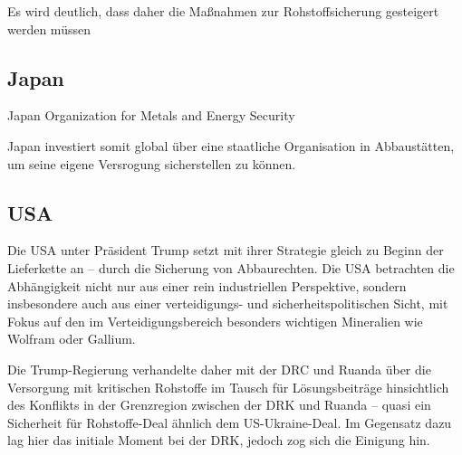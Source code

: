 \documentclass[12pt,a4paper,oneside]{book} %
\begin{document}
Es wird deutlich, dass daher die Maßnahmen zur Rohstoffsicherung gesteigert werden müssen


\subsection{Japan}

Japan Organization for Metals and Energy Security

Japan investiert somit global über eine staatliche Organisation in Abbaustätten, um seine eigene Versrogung sicherstellen zu können.


\subsection{USA}
Die USA unter Präsident Trump setzt mit ihrer Strategie gleich zu Beginn der Lieferkette an -- durch die Sicherung von Abbaurechten. Die USA betrachten die Abhängigkeit nicht nur aus einer rein industriellen Perspektive, sondern insbesondere auch aus einer verteidigungs- und sicherheitspolitischen Sicht, mit Fokus auf den im Verteidigungsbereich besonders wichtigen Mineralien wie Wolfram oder Gallium.

Die Trump-Regierung verhandelte daher mit der DRC und Ruanda über die Versorgung mit kritischen Rohstoffe im Tausch für Lösungsbeiträge hinsichtlich des Konflikts in der Grenzregion zwischen der DRK und Ruanda -- quasi ein \glqq Sicherheit für Rohstoffe\grqq-Deal ähnlich dem US-Ukraine-Deal. Im Gegensatz dazu lag hier das initiale Moment bei der DRK, jedoch zog sich die Einigung hin.

\end{document}
